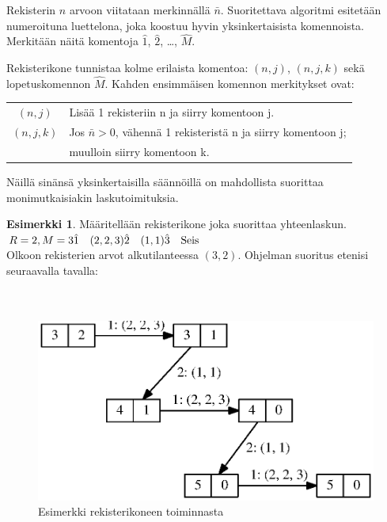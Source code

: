 \documentclass[a4paper, 12pt]{article}
\theoremstyle{definition}
\newtheorem{example}[mydef]{Esimerkki}
\theoremstyle{plain}
\begin{document}
Rekisterin $n$ arvoon viitataan merkinnällä $\bar{n}$. Suoritettava algoritmi esitetään numeroituna luettelona, joka koostuu hyvin yksinkertaisista komennoista. Merkitään näitä komentoja $\hat{1}$, $\hat{2}$, \dots , $\hat{M}$. 


Rekisterikone tunnistaa kolme erilaista komentoa: $(n,j)$, $(n,j,k)$ sekä lopetuskomennon $\hat{M}$. Kahden ensimmäisen komennon merkitykset ovat:

\begin{tabular}{c l}
$(n, j)$ & Lisää 1 rekisteriin n ja siirry komentoon j. \\
$(n, j, k)$ & Jos $\bar{n} > 0$, vähennä 1 rekisteristä n ja siirry komentoon j; \\
& muulloin siirry komentoon k.\\
\end{tabular}


Näillä sinänsä yksinkertaisilla säännöillä on mahdollista suorittaa monimutkaisiakin laskutoimituksia.

\begin{example}
Määritellään rekisterikone joka suorittaa yhteenlaskun.
\\
\begin{math} \\
R = 2, M = 3 \\
\hat{1}\quad (2,2,3) \\
\hat{2}\quad (1,1) \\
\hat{3}\quad \text{Seis}\\
\end{math}
\\
Olkoon rekisterien arvot alkutilanteessa $(3, 2)$. Ohjelman suoritus etenisi seuraavalla tavalla:\\ \\
\\
\begin{figure}[H]
\begin{center}
\includegraphics{graph3.eps}
\caption{Esimerkki rekisterikoneen toiminnasta}
\end{center}
\end{figure}


\end{example}
\end{document}
